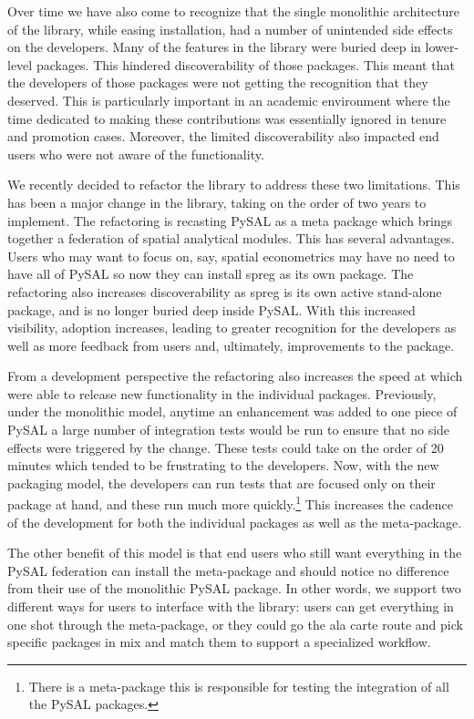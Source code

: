 \documentclass[11pt]{article}
\begin{document}
Over time we have also come to recognize that the single monolithic
architecture of the library, while easing installation, had a number of
unintended side effects on the developers. Many of the features in the library
were buried deep in lower-level packages. This hindered discoverability of
those packages. This meant that the developers of those packages were not
getting the recognition that they deserved. This is particularly important in an
academic environment where the time dedicated to making these contributions was
essentially ignored in tenure and promotion cases. Moreover, the limited
discoverability also impacted end users who were not aware of the
functionality.


We recently decided to refactor the library to address these two limitations.
This has been a major change in the library, taking on the order of two years
to implement. The refactoring is recasting PySAL as a meta package which brings
together a federation of spatial analytical modules. This has several
advantages. Users who may want to focus on, say, spatial econometrics
may have no need to have all of PySAL so now they can install spreg as its own
package. The refactoring also increases discoverability as spreg is its own
active stand-alone package, and is no longer buried deep inside PySAL. With
this increased visibility, adoption increases, leading to greater recognition
for the developers as well as more feedback from users and, ultimately,
improvements to the package.

From a development perspective the refactoring also increases the speed at
which were able to release new functionality in the individual packages.
Previously, under the monolithic model, anytime an enhancement was
added to one piece of PySAL a large number of integration tests would be run to
ensure that no side effects were triggered by the change. These tests could
take on the order of 20 minutes which tended to be frustrating
to the developers. Now, with the new packaging model, the developers can run
 tests that are focused only on their package at hand, and these run much more
quickly.\footnote{There is a meta-package this is responsible for testing the
integration of all the PySAL packages.} This increases the cadence of the development for both
the individual packages as well as the meta-package.


The other benefit of this model is that end users who still want everything in
the PySAL federation can install the meta-package and should notice no
difference from their use of the monolithic PySAL package. In other words, we
support two different ways for users to interface with the library: users can
get everything in one shot through the meta-package, or they could go the ala
carte route and pick specific packages in mix and match them to support a
specialized workflow.
\end{document}
